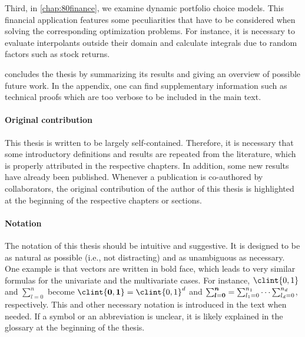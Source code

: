 Third, in \cref{chap:80finance},
we examine dynamic portfolio choice models.
This financial application features some peculiarities that have
to be considered when solving the corresponding optimization problems.
For instance, it is necessary to evaluate interpolants outside their domain
and calculate integrals due to random factors such as stock returns.

 concludes the thesis by
summarizing its results and giving an overview of possible future work.
In the appendix, one can find supplementary information such as
technical proofs which are too verbose to be included in the main text.

\paragraph{Original contribution}

This thesis is written to be largely self-contained.
Therefore, it is necessary that some introductory definitions and
results are repeated from the literature,
which is properly attributed in the respective chapters.
In addition, some new results have already been published.
Whenever a publication is co-authored by collaborators,
the original contribution of the author of this thesis is highlighted
at the beginning of the respective chapters or sections.

\paragraph{Notation}

The notation of this thesis should be intuitive and suggestive.
It is designed to be as natural as possible (i.e., not distracting)
and as unambiguous as necessary.
One example is that vectors are written in bold face, which leads to
very similar formulas for the univariate and the multivariate cases.
For instance, $\clint{0, 1}$ and $\sum_{l=0}^n$
become
$\clint{\*0, \*1} = \clint{0, 1}^d$ and
$\sum_{{\boldsymbol{l}}={\boldsymbol{0}}}^{{\boldsymbol{n}}} = \sum_{l_1=0}^{n_1} \dotsb \sum_{l_d=0}^{n_d}$,
respectively.
This and other necessary notation is introduced in the text when needed.
If a symbol or an abbreviation is unclear,
it is likely explained in the glossary at the beginning of the thesis.

\cleardoublepage
